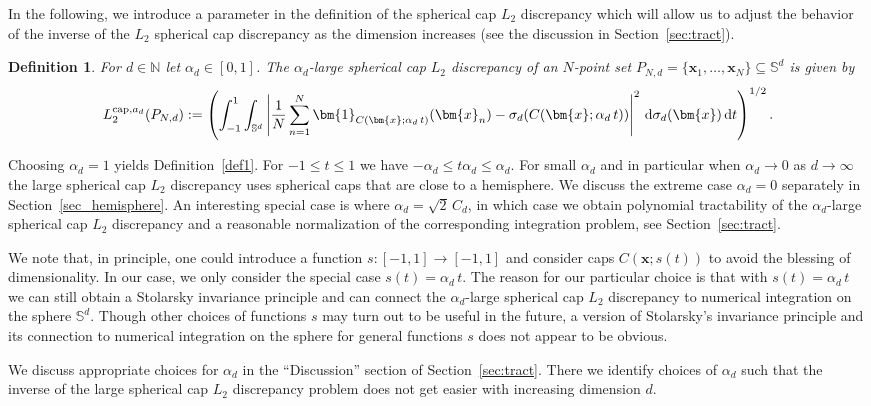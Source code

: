\documentclass[12pt]{article}
\newcommand{\cp}{{\rm cap}}
\newtheorem{definition}{Definition}
\begin{document}
In the following, we introduce a parameter in the definition of the spherical cap $L_2$ discrepancy which will allow us to adjust the behavior of the inverse of the $L_2$ spherical cap discrepancy as the dimension increases (see the discussion in Section~\ref{sec:tract}).

\newpage
\begin{definition}\rm
For $d \in \mathbb{N}$ let $\alpha_d \in [0, 1]$. The $\alpha_d$-large spherical cap $L_2$ discrepancy of an $N$-point set $P_{N,d} =\{ \bm{x}_1, \ldots, \bm{x}_N\} \subseteq \mathbb{S}^d$ is given by
\begin{equation*}
L_2^{\cp,a_d}(P_{N,d}) :=\left(\int_{-1}^1 \int_{\mathbb{S}^d} \left|\frac{1}{N} \sum_{n=1}^N \bm{1}_{C(\bm{x}; \alpha_d \, t)}(\bm{x}_n) -\sigma_d(C(\bm{x}; \alpha_d \, t))\right|^2 \,\mathrm{d} \sigma_d(\bm{x}) \,\mathrm{d} t\right)^{1/2}.
\end{equation*}
\end{definition}

Choosing $\alpha_d=1$ yields Definition~\ref{def1}. For $-1 \le t \le 1$ we have $-\alpha_d \le t\alpha_d \le \alpha_d$. 
%
For small $\alpha_d$ and in particular when $\alpha_d \to 0$ as $d \to \infty$ the large spherical cap $L_2$ discrepancy uses spherical caps that are close to a hemisphere.
%
We discuss the extreme case $\alpha_d = 0$ separately in Section~\ref{sec_hemisphere}.
%
An interesting special case is where $\alpha_d = \sqrt{2} \, C_d$, in which case we obtain polynomial tractability of the $\alpha_d$-large spherical cap $L_2$ discrepancy and a reasonable normalization of the corresponding integration problem, see Section~\ref{sec:tract}. %


We note that, in principle, one could introduce a function $s:[-1,1] \to [-1,1]$ and consider caps $C(\bm{x}; s(t))$ to avoid the blessing of dimensionality. In our case, we only consider the special case $s(t) = \alpha_d \, t$. The reason for our particular choice is that with $s(t) = \alpha_d \, t$ we can still obtain a Stolarsky invariance principle and can connect the $\alpha_d$-large spherical cap $L_2$ discrepancy to numerical integration on the sphere $\mathbb{S}^d$. Though other choices of functions $s$ may turn out to be useful in the future, a version of Stolarsky's invariance principle and its connection to numerical integration on the sphere for general functions $s$ does not appear to be obvious.

We discuss appropriate choices for $\alpha_d$ in the ``Discussion'' section of Section~\ref{sec:tract}. There we identify choices of $\alpha_d$ such that the inverse of the large spherical cap $L_2$ discrepancy problem does not get easier with increasing dimension $d$.
\end{document}
